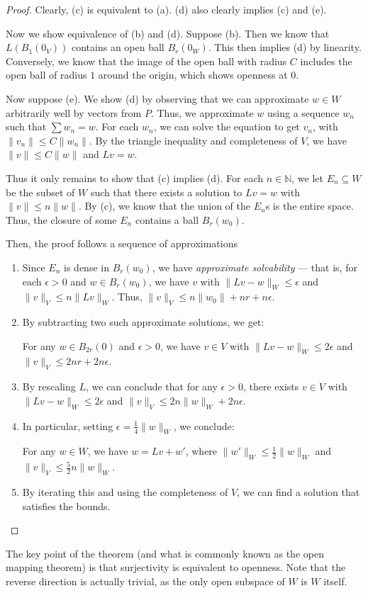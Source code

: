 \documentclass[twoside,symmetric, openany, 12pt]{./tuftebook}
\theoremstyle{definition}
\theoremstyle{definition}
\theoremstyle{definition}
\newcommand{\N}{\mathbb{N}}
\begin{document}
\begin{proof}
	Clearly, (c) is equivalent to (a). (d) also clearly implies (c) and (e). 
	
	Now we show equivalence of (b) and (d). Suppose (b). Then we know that $L(B_1(0_V))$ contains an open ball $B_r(0_W)$. This then implies (d) by linearity. Conversely, we know that the image of the open ball with radius $C$ includes the open ball of radius $1$ around the origin, which shows openness at 0.  
	
	Now suppose (e). We show (d) by observing that we can approximate $w\in W$ arbitrarily well by vectors from $P$. Thus, we approximate $w$ using a sequence $w_n$ such that $\sum w_n = w$. For each $w_n$, we can solve the equation to get $v_n$, with $\| v_n\| \le C \| w_n\|$. By the triangle inequality and completeness of $V$, we have $\|v\| \le C \|w\|$ and $Lv = w$. 
	
	Thus it only remains to show that (c) implies (d). For each $n\in \N$, we let $E_n\subseteq W$ be the subset of $W$ such that there exists a solution to $Lv=w$ with $\|v\|\le n \|w\|$. By (c), we know that the union of the $E_n$s is the entire space. Thus, the closure of some $E_n$ contains a ball $B_r(w_0)$. 
	
	Then, the proof follows a sequence of approximations
	\begin{enumerate}
		\item Since $E_n$ is dense in $B_r(w_0)$, we have \emph{approximate solvability} --- that is, for each $\epsilon>0$ and $w\in B_r(w_0)$, we have $v$ with $\|Lv - w\|_W \le \epsilon$ and $\|v\|_V\le n \|Lv\|_W$. Thus, $\|v\|_V \le n \|w_0\| + nr + n\epsilon$. 
		\item By subtracting two such approximate solutions, we get:
		
		For any $w\in B_{2r}(0)$ and $\epsilon>0$, we have $v\in V$ with $\|Lv - w\|_W\le 2 \epsilon$ and $\|v\|_V \le 2 n r + 2 n \epsilon$.
		\item By rescaling $L$, we can conclude that for any $\epsilon>0$, there exists $v\in V$ with $\|Lv - w\|_W\le 2\epsilon$ and $\|v\|_V \le 2 n \|w\|_W + 2 n \epsilon$.
		\item In particular, setting $\epsilon=\frac 14 \|w\|_W$, we conclude:
		
		For any $w\in W$, we have $w=Lv + w'$, where $\|w'\|_W\le \frac 12 \|w\|_W$ and $\|v\|_V\le \frac 52 n \|w\|_W$.
		\item By iterating this and using the completeness of $V$, we can find a solution that satisfies the bounds.\qedhere
	\end{enumerate}
\end{proof}	
The key point of the theorem (and what is commonly known as the open mapping theorem) is that surjectivity is equivalent to openness. Note that the reverse direction is actually trivial, as the only open subspace of $W$ is $W$ itself. 
\end{document}
